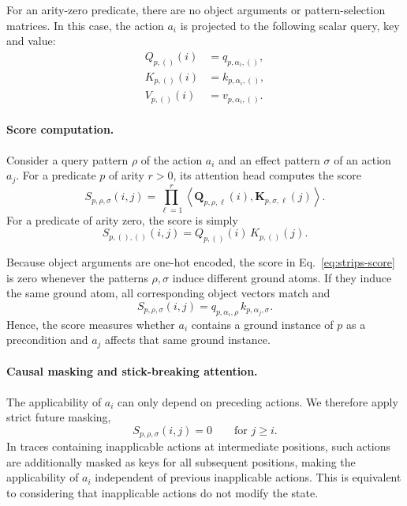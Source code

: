 For an arity-zero predicate, there are no object arguments or
pattern-selection matrices.
In this case, the action $a_i$ is projected to the following scalar query, key and value:
\begin{equation}
\begin{aligned}
Q_{p,()}(i) &= q_{p,\alpha_i,()},\\
K_{p,()}(i) &= k_{p,\alpha_i,()},\\
V_{p,()}(i) &= v_{p,\alpha_i,()}.
\end{aligned}
\label{eq:strips-nullary-qkv}
\end{equation}



\paragraph{Score computation.}
Consider a query pattern $\rho$ of the action $a_i$ and an effect pattern $\sigma$ of an action $a_j$.
For a predicate $p$ of arity $r>0$, its attention head computes the score
\begin{equation}
S_{p,\rho,\sigma}(i,j)
=
\prod_{\ell=1}^{r}
\left\langle
\mathbf{Q}_{p,\rho,\ell}(i),
\mathbf{K}_{p,\sigma,\ell}(j)
\right\rangle.
\label{eq:strips-score}
\end{equation}
For a predicate of arity zero, the score is simply
\begin{equation}
S_{p,(),()}(i,j)
=
Q_{p,()}(i)\,K_{p,()}(j).
\label{eq:strips-nullary-score}
\end{equation}

Because object arguments are one-hot encoded, the score in Eq.~\ref{eq:strips-score} is zero whenever the patterns $\rho,\sigma$ induce different ground atoms.
If they induce the same ground atom, all corresponding object vectors match and
\begin{equation}
S_{p,\rho,\sigma}(i,j)
=
q_{p,\alpha_i,\rho}\,
k_{p,\alpha_j,\sigma}.
\label{eq:strips-matching-score}
\end{equation}
Hence, the score measures whether $a_i$ contains a ground instance of $p$ as a precondition and $a_j$ affects that same ground instance.



\paragraph{Causal masking and stick-breaking attention.}
The applicability of $a_i$ can only depend on preceding actions.
We therefore apply strict future masking,
\begin{equation}
S_{p,\rho,\sigma}(i,j)=0
\qquad
\text{for } j\geq i.
\label{eq:strips-future-mask}
\end{equation}
In traces containing inapplicable actions at intermediate positions, such
actions are additionally masked as keys for all subsequent positions, making
the applicability of $a_i$ independent of previous inapplicable actions.
This is equivalent to considering that inapplicable actions do not modify the
state.

